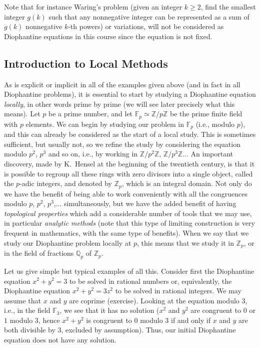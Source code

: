 \documentclass[12pt,a4paper]{article}
\newcommand{\isom}{\simeq}
\newcommand{\Q}{{\mathbb Q}}
\newcommand{\Z}{{\mathbb Z}}
\newcommand{\F}{{\mathbb F}}
\begin{document}
\medskip

Note that for instance Waring's problem (given an integer $k\ge2$, find the 
smallest integer $g(k)$ such that any nonnegative integer can be represented 
as a sum of $g(k)$ nonnegative $k$-th powers) or variations, will not be
considered as Diophantine equations in this course since the equation is
not fixed.

\subsection{Introduction to Local Methods}

As is explicit or implicit in all of the examples given above (and in fact
in all Diophantine problems), it is essential to start by studying a
Diophantine equation \emph{locally}, in other words prime by prime (we will
see later precisely what this means). Let $p$ be a prime number, and let 
$\F_p\isom\Z/p\Z$ be the prime finite field with $p$ elements. We can begin by 
studying our problem in $\F_p$ (i.e., modulo $p$), and this can already be 
considered as the start of a local study. This is sometimes sufficient, but 
usually not, so we refine the study by considering the equation
modulo $p^2$, $p^3$ and so on, i.e., by working in
$\Z/p^2\Z$, $\Z/p^3\Z$... An important discovery, made by K.~Hensel at the
beginning of the twentieth century, is that it is possible to regroup all
these rings with zero divisors into a single object, called the $p$-adic 
integers, and denoted by $\Z_p$, which is an integral domain. Not only do we
have the benefit of being able to work conveniently with all the congruences
modulo $p$, $p^2$, $p^3$,... simultaneously, but we have the added benefit
of having \emph{topological properties} which add a considerable number of
tools that we may use, in particular \emph{analytic methods} (note that this 
type of limiting construction is very frequent in mathematics, with the same 
type of benefits). When we say that we study our Diophantine problem locally at
$p$, this means that we study it in $\Z_p$, or in the field of fractions 
$\Q_p$ of $\Z_p$.

\smallskip

Let us give simple but typical examples of all this. Consider first the 
Diophantine equation $x^2+y^2=3$ to be solved in rational numbers or,
equivalently, the Diophantine equation $x^2+y^2=3z^2$ to be solved in rational
integers. We may assume that $x$ and $y$ are coprime (exercise). 
Looking at the equation modulo $3$, i.e., in the field $\F_3$, we see that it 
has no solution ($x^2$ and $y^2$ are congruent to $0$ or $1$ modulo $3$, hence
$x^2+y^2$ is congruent to $0$ modulo $3$ if and only if $x$ and $y$ are
both divisible by $3$, excluded by assumption). Thus, our initial Diophantine
equation does not have any solution. 
\end{document}
